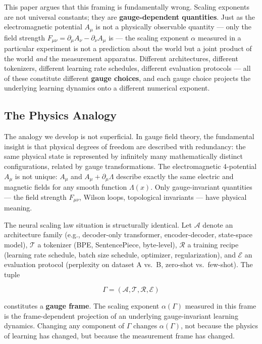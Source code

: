 \documentclass[12pt,a4paper]{article}
\theoremstyle{remark}
\newcommand{\arch}{\mathcal{A}}
\newcommand{\tok}{\mathcal{T}}
\newcommand{\recipe}{\mathcal{R}}
\begin{document}
This paper argues that this framing is fundamentally wrong. Scaling exponents are not universal constants; they are \textbf{gauge-dependent quantities}. Just as the electromagnetic potential $A_\mu$ is not a physically observable quantity — only the field strength $F_{\mu\nu} = \partial_\mu A_\nu - \partial_\nu A_\mu$ is — the scaling exponent $\alpha$ measured in a particular experiment is not a prediction about the world but a joint product of the world \emph{and} the measurement apparatus. Different architectures, different tokenizers, different learning rate schedules, different evaluation protocols — all of these constitute different \textbf{gauge choices}, and each gauge choice projects the underlying learning dynamics onto a different numerical exponent.

\subsection{The Physics Analogy}

The analogy we develop is not superficial. In gauge field theory, the fundamental insight is that physical degrees of freedom are described with redundancy: the same physical state is represented by infinitely many mathematically distinct configurations, related by gauge transformations. The electromagnetic 4-potential $A_\mu$ is not unique: $A_\mu$ and $A_\mu + \partial_\mu \Lambda$ describe exactly the same electric and magnetic fields for any smooth function $\Lambda(x)$. Only gauge-invariant quantities — the field strength $F_{\mu\nu}$, Wilson loops, topological invariants — have physical meaning.

The neural scaling law situation is structurally identical. Let $\arch$ denote an architecture family (e.g., decoder-only transformer, encoder-decoder, state-space model), $\tok$ a tokenizer (BPE, SentencePiece, byte-level), $\recipe$ a training recipe (learning rate schedule, batch size schedule, optimizer, regularization), and $\mathcal{E}$ an evaluation protocol (perplexity on dataset A vs.\ B, zero-shot vs.\ few-shot). The tuple

\begin{equation}
\Gamma = (\arch, \tok, \recipe, \mathcal{E})
\end{equation}

constitutes a \textbf{gauge frame}. The scaling exponent $\alpha(\Gamma)$ measured in this frame is the frame-dependent projection of an underlying gauge-invariant learning dynamics. Changing any component of $\Gamma$ changes $\alpha(\Gamma)$, not because the physics of learning has changed, but because the measurement frame has changed.
\end{document}
